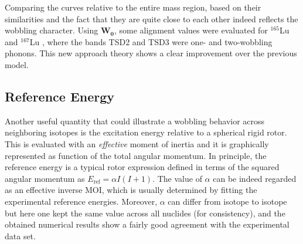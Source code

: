 Comparing the curves relative to the entire mass region, based on their similarities and the fact that they are quite close to each other indeed reflects the wobbling character. Using $\mathbf{W_0}$, some alignment values were evaluated for $^{165}$Lu and $^{167}$Lu \cite{raduta2018wobbling}, where the bands TSD2 and TSD3 were one- and two-wobbling phonons. This new approach theory shows a clear improvement over the previous model.

\subsection{Reference Energy}

Another useful quantity that could illustrate a wobbling behavior across neighboring isotopes is the excitation energy relative to a spherical rigid rotor. This is evaluated with an \emph{effective} moment of inertia and it is graphically represented as function of the total angular momentum. In principle, the reference energy is a typical rotor expression defined in terms of the squared angular momentum as $E_\text{ref}=\alpha I(I+1)$. The value of $\alpha$ can be indeed regarded as an effective inverse MOI, which is usually determined by fitting the experimental reference energies. Moreover, $\alpha$ can differ from isotope to isotope but here one kept the same value across all nuclides (for consistency), and the obtained numerical results show a fairly good agreement with the experimental data set.

